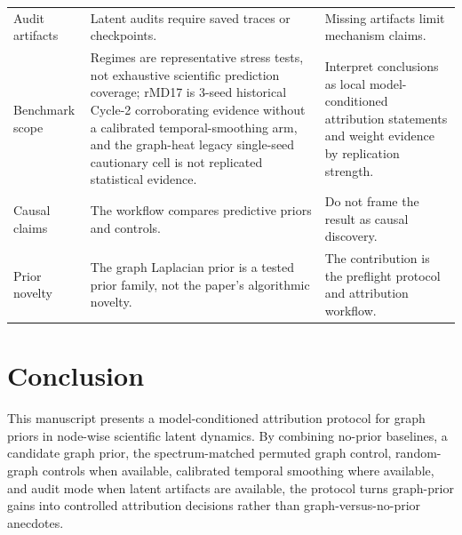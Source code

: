 \documentclass[preprint,12pt]{elsarticle}
\begin{document}
\begin{longtable}{>{\raggedright\arraybackslash}p{}>{\raggedright\arraybackslash}p{}>{\raggedright\arraybackslash}p{}}
Audit artifacts & Latent audits require saved traces or checkpoints. & Missing artifacts limit mechanism claims. \\
Benchmark scope & Regimes are representative stress tests, not exhaustive scientific prediction coverage; rMD17 is 3-seed historical Cycle-2 corroborating evidence without a calibrated temporal-smoothing arm, and the graph-heat legacy single-seed cautionary cell is not replicated statistical evidence. & Interpret conclusions as local model-conditioned attribution statements and weight evidence by replication strength. \\
Causal claims & The workflow compares predictive priors and controls. & Do not frame the result as causal discovery. \\
Prior novelty & The graph Laplacian prior is a tested prior family, not the paper's algorithmic novelty. & The contribution is the preflight protocol and attribution workflow. \\
\end{longtable}
\endgroup

\section{Conclusion}
\label{sec:conclusion}

This manuscript presents a model-conditioned attribution protocol for 
graph priors in node-wise scientific latent dynamics. By combining 
no-prior baselines, a candidate graph prior, the spectrum-matched 
permuted graph control, random-graph controls when available, 
calibrated temporal smoothing where available, and audit mode when 
latent artifacts are available, the protocol turns graph-prior gains 
into controlled attribution decisions rather than graph-versus-no-prior 
anecdotes.
\end{document}
